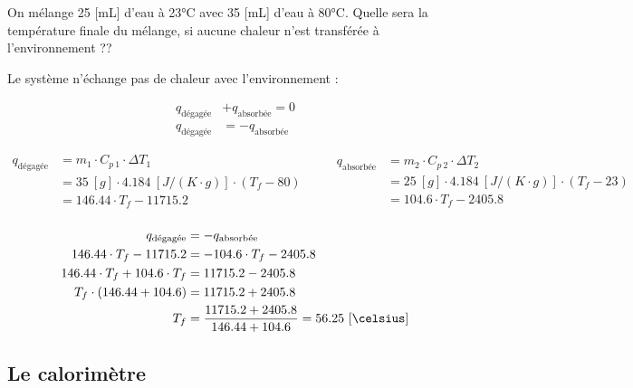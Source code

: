 \documentclass[
  11pt,
  french,
  a4paper,
  openany]{book}
\begin{document}
\begin{Exercise}

On mélange 25 {[}mL{]} d'eau à 23°C avec 35 {[}mL{]} d'eau à 80°C. Quelle sera la température finale du mélange, si aucune chaleur n'est transférée à l'environnement ??



\end{Exercise}

\begin{Answer}
Le système n'échange pas de chaleur avec l'environnement :

\[
\begin{split}
q_{\text{dégagée}} &+ q_{\text{absorbée}} = 0 \\
q_{\text{dégagée}} &= - q_{\text{absorbée}}
\end{split}
\]

\[
\begin{split}
q_{\text{dégagée}} &= m_1 \cdot C_{p\ 1} \cdot \Delta T_1 \\
  &= 35\ [g] \cdot 4.184\ [J/(K \cdot g)] \cdot (T_f - 80) \\
  &= 146.44 \cdot T_f - 11715.2 \\
\end{split}
\qquad
\begin{split}
q_{\text{absorbée}} &= m_2 \cdot C_{p\ 2} \cdot \Delta T_2 \\
  &= 25\ [g] \cdot 4.184\ [J/(K \cdot g)] \cdot (T_f - 23) \\
  &= 104.6 \cdot T_f - 2405.8 \\
\end{split}
\]

\[
\begin{split}
q_{\text{dégagée}} &= - q_{\text{absorbée}} \\
146.44 \cdot T_f - 11715.2 &= - 104.6 \cdot T_f - 2405.8 \\
146.44 \cdot T_f + 104.6 \cdot T_f &= 11715.2 - 2405.8 \\
T_f \cdot (146.44 + 104.6) &= 11715.2 + 2405.8 \\
T_f &= \frac{11715.2 + 2405.8}{146.44+104.6} = 56.25\ [\celsius]
\end{split}
\]

\end{Answer}

\hypertarget{le-calorimuxe8tre}{%
\subsection{Le calorimètre}\label{le-calorimuxe8tre}}
\end{document}
